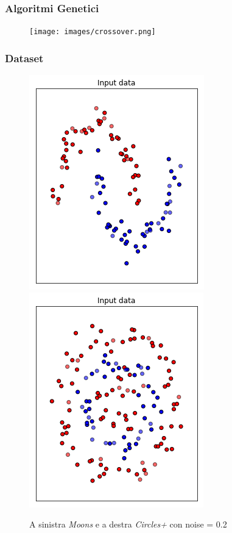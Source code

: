 \documentclass{beamer}
\begin{document}
\begin{frame}
 \frametitle{Algoritmi Genetici}
 \begin{figure}
  \texttt{[image: images/crossover.png]}
 \end{figure}

\end{frame}


\begin{frame}
 \frametitle{Dataset}
 \begin{figure}
  \centering
  \includegraphics[scale = 0.5]{images/moons_noise.png}
  \includegraphics[scale = 0.5]{images/circles+_noise.png}
  \caption{\large A sinistra \textit{Moons} e a destra \textit{Circles+} con noise = 0.2}
 \end{figure}

\end{frame}
\end{document}
